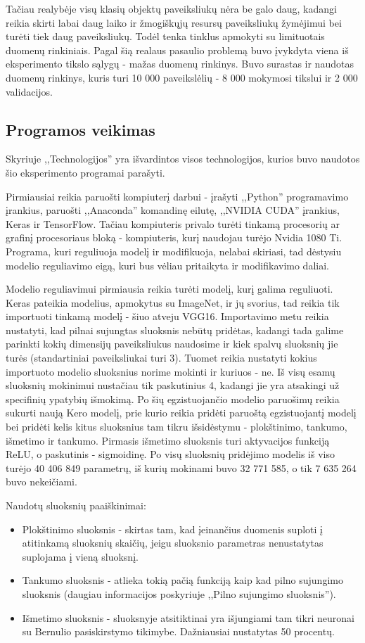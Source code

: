 \documentclass{VUMIFPSkursinis}
\begin{document}
Tačiau realybėje visų klasių objektų paveiksliukų nėra be galo daug, kadangi reikia skirti labai daug laiko ir žmogiškųjų resursų paveiksliukų žymėjimui bei turėti tiek 
daug paveiksliukų. Todėl tenka tinklus apmokyti su limituotais duomenų rinkiniais. Pagal šią realaus pasaulio problemą buvo įvykdyta viena iš eksperimento tikslo sąlygų - 
mažas duomenų rinkinys. Buvo surastas ir naudotas duomenų rinkinys, kuris turi 10 000 paveikslėlių - 8 000 mokymosi tikslui ir 2 000 validacijos.

\subsection{Programos veikimas}
Skyriuje ,,Technologijos'' yra išvardintos visos technologijos, kurios buvo naudotos šio eksperimento programai parašyti.

Pirmiausiai reikia paruošti kompiuterį darbui - įrašyti ,,Python'' programavimo įrankius, paruošti ,,Anaconda'' komandinę eilutę, ,,NVIDIA CUDA'' įrankius, Keras ir 
TensorFlow. Tačiau kompiuteris privalo turėti tinkamą procesorių ar grafinį procesoriaus bloką - kompiuteris, kurį naudojau turėjo Nvidia 1080 Ti. Programa, kuri 
reguliuoja modelį ir modifikuoja, nelabai skiriasi, tad dėstysiu modelio reguliavimo eigą, kuri bus vėliau pritaikyta ir modifikavimo daliai. 

Modelio reguliavimui pirmiausia reikia turėti modelį, kurį galima reguliuoti. Keras pateikia modelius, apmokytus su ImageNet, ir jų svorius, tad reikia tik importuoti 
tinkamą modelį - šiuo atveju VGG16. Importavimo metu reikia nustatyti, kad pilnai sujungtas sluoksnis nebūtų pridėtas, kadangi tada galime parinkti kokių dimensijų 
paveiksliukus naudosime ir kiek spalvų sluoksnių jie turės (standartiniai paveiksliukai turi 3). Tuomet reikia nustatyti kokius importuoto modelio sluoksnius norime 
mokinti ir kuriuos - ne. Iš visų esamų sluoksnių mokinimui nustačiau tik paskutinius 4, kadangi jie yra atsakingi už specifinių ypatybių išmokimą. Po šių egzistuojančio 
modelio paruošimų reikia sukurti naują Kero modelį, prie kurio reikia pridėti paruoštą egzistuojantį modelį bei pridėti kelis kitus sluoksnius tam tikru išsidėstymu - 
plokštinimo, tankumo, išmetimo ir tankumo. Pirmasis išmetimo sluoksnis turi aktyvacijos funkciją ReLU, o paskutinis - sigmoidinę. Po visų sluoksnių pridėjimo modelis iš 
viso turėjo 40 406 849 parametrų, iš kurių mokinami buvo 32 771 585, o tik 7 635 264 buvo nekeičiami. 

Naudotų sluoksnių paaiškinimai:
\begin{itemize}
\item Plokštinimo sluoksnis - skirtas tam, kad įeinančius duomenis suploti į atitinkamą sluoksnių skaičių, jeigu sluoksnio parametras nenustatytas suplojama į vieną sluoksnį.
\item Tankumo sluoksnis - atlieka tokią pačią funkciją kaip kad pilno sujungimo sluoksnis (daugiau informacijos poskyriuje ,,Pilno sujungimo sluoksnis'').
\item Išmetimo sluoksnis - sluoksnyje atsitiktinai yra išjungiami tam tikri neuronai su Bernulio pasiskirstymo tikimybe. Dažniausiai nustatytas 50 procentų.
\end{itemize}
\end{document}
